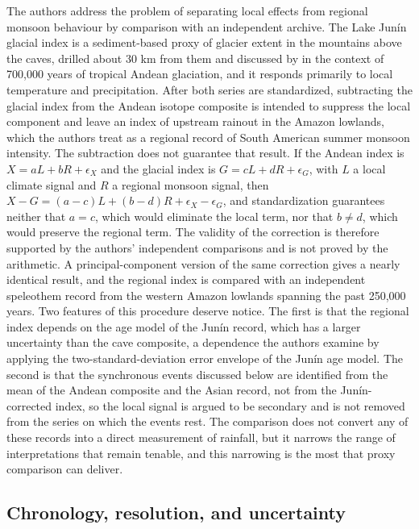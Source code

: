 \documentclass[11pt]{article}
\theoremstyle{definition}
\begin{document}
The authors address the problem of separating local effects from regional monsoon behaviour by comparison with an independent archive. The Lake Junín glacial index is a sediment-based proxy of glacier extent in the mountains above the caves, drilled about 30 km from them and discussed by \citet{rodbell2022} in the context of 700,000 years of tropical Andean glaciation, and it responds primarily to local temperature and precipitation. After both series are standardized, subtracting the glacial index from the Andean isotope composite is intended to suppress the local component and leave an index of upstream rainout in the Amazon lowlands, which the authors treat as a regional record of South American summer monsoon intensity. The subtraction does not guarantee that result. If the Andean index is $X = aL + bR + \epsilon_X$ and the glacial index is $G = cL + dR + \epsilon_G$, with $L$ a local climate signal and $R$ a regional monsoon signal, then $X - G = (a-c)L + (b-d)R + \epsilon_X - \epsilon_G$, and standardization guarantees neither that $a = c$, which would eliminate the local term, nor that $b \neq d$, which would preserve the regional term. The validity of the correction is therefore supported by the authors' independent comparisons and is not proved by the arithmetic. A principal-component version of the same correction gives a nearly identical result, and the regional index is compared with an independent speleothem record from the western Amazon lowlands spanning the past 250,000 years. Two features of this procedure deserve notice. The first is that the regional index depends on the age model of the Junín record, which has a larger uncertainty than the cave composite, a dependence the authors examine by applying the two-standard-deviation error envelope of the Junín age model. The second is that the synchronous events discussed below are identified from the mean of the Andean composite and the Asian record, not from the Junín-corrected index, so the local signal is argued to be secondary and is not removed from the series on which the events rest. The comparison does not convert any of these records into a direct measurement of rainfall, but it narrows the range of interpretations that remain tenable, and this narrowing is the most that proxy comparison can deliver.

\subsection{Chronology, resolution, and uncertainty}
\end{document}
